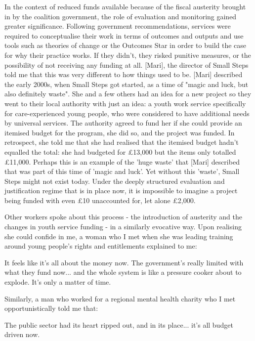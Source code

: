 In the context of reduced funds available because of the fiscal austerity brought in by the coalition government, the role of evaluation and monitoring gained greater significance. Following government recommendations, services were required to conceptualise their work in terms of outcomes and outputs and use tools such as theories of change or the Outcomes Star in order to build the case for why their practice works. If they didn't, they risked punitive measures, or the possibility of not receiving any funding at all. [Mari], the director of Small Steps told me that this was very different to how things used to be. [Mari] described the early 2000s, when Small Steps got started, as a time of "magic and luck, but also definitely waste". She and a few others had an idea for a new project so they went to their local authority with just an idea: a youth work service specifically for care-experienced young people, who were considered to have additional needs by universal services. The authority agreed to fund her if she could provide an itemised budget for the program, she did so, and the project was funded. In retrospect, she told me that she had realised that the itemised budget hadn't equalled the total: she had budgeted for £13,000 but the items only totalled £11,000. Perhaps this is an example of the 'huge waste' that [Mari] described that was part of this time of 'magic and luck'. Yet without this 'waste', Small Steps might not exist today. Under the deeply structured evaluation and justification regime that is in place now, it is impossible to imagine a project being funded with even £10 unaccounted for, let alone £2,000.

Other workers spoke about this process - the introduction of austerity and the changes in youth service funding - in a similarly evocative way. Upon realising she could confide in me, a woman who I met when she was leading training around young people's rights and entitlements explained to me:

It feels like it's all about the money now. The government's really limited with what they fund now... and the whole system is like a pressure cooker about to explode. It's only a matter of time.

Similarly, a man who worked for a regional mental health charity who I met opportunistically told me that:

The public sector had its heart ripped out, and in its place... it's all budget driven now.


